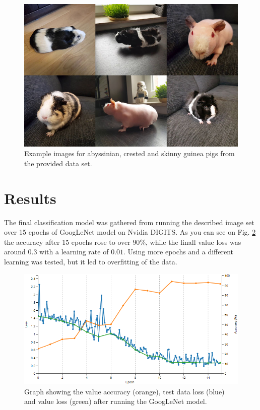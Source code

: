 \documentclass[10pt,journal,compsoc]{IEEEtran}
\begin{document}
    \begin{figure}[h]
        \includegraphics[width=\linewidth]{pig_dataset.png}
        \caption{Example images for abyssinian, crested and skinny guinea pigs from the provided data set.}
        \label{fig:pigs}
        \centering
    \end{figure}
    
    \section{Results}

    The final classification model was gathered from running the described image set over 15 epochs of GoogLeNet model on Nvidia DIGITS. As you can see on Fig. \ref{fig:googlenet} the accuracy after 15 epochs rose to over $90\%$, while the finall value loss was around $0.3$ with a learning rate of $0.01$. Using more epochs and a different learning was tested, but it led to overfitting of the data.

    \begin{figure}[h]
        \includegraphics[width=\linewidth]{googlenet.png}
        \caption{Graph showing the value accuracy (orange), test data loss (blue) and value loss (green) after running the GoogLeNet model.}
        \label{fig:googlenet}
        \centering
    \end{figure}
\end{document}
